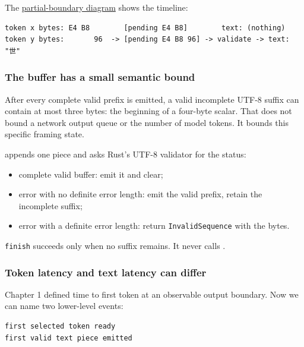 \documentclass[
  10pt,
]{article}
\providecommand{\tightlist}{%
  \setlength{\itemsep}{0pt}\setlength{\parskip}{0pt}}
\begin{document}
The
\href{https://github.com/hermonai/inside-the-llm-engine/blob/astra-visual-rewrite/diagrams/tokenizer/utf8-partial-token-boundary.txt}{partial-boundary
diagram} shows the timeline:

\begin{verbatim}
token x bytes: E4 B8        [pending E4 B8]        text: (nothing)
token y bytes:       96  -> [pending E4 B8 96] -> validate -> text: "世"
\end{verbatim}

\subsubsection{The buffer has a small semantic
bound}\label{the-buffer-has-a-small-semantic-bound}

After every complete valid prefix is emitted, a valid incomplete UTF-8
suffix can contain at most three bytes: the beginning of a four-byte
scalar. That does not bound a network output queue or the number of
model tokens. It bounds this specific framing state.

\texttt{} appends one piece and asks
Rust's UTF-8 validator for the status:

\begin{itemize}
\tightlist
\item
  complete valid buffer: emit it and clear;
\item
  error with no definite error length: emit the valid prefix, retain the
  incomplete suffix;
\item
  error with a definite error length: return \texttt{InvalidSequence}
  with the bytes.
\end{itemize}

\texttt{finish} succeeds only when no suffix remains. It never calls
\texttt{}.

\subsubsection{Token latency and text latency can
differ}\label{token-latency-and-text-latency-can-differ}

Chapter 1 defined time to first token at an observable output boundary.
Now we can name two lower-level events:

\begin{verbatim}
first selected token ready
first valid text piece emitted
\end{verbatim}
\end{document}
